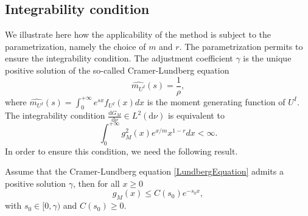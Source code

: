 \subsection{Integrability condition}
We illustrate here how the applicability of the method is subject to the parametrization, namely the choice of $m$ and $r$. The parametrization permits to ensure the integrability condition. The adjustment coefficient $\gamma$ is the unique positive solution of the so-called Cramer-Lundberg equation
\begin{equation}\label{LundbergEquation}
\widehat{m_{U^{I}}}(s)=\frac{1}{\rho},
\end{equation}
where $\widehat{m_{U^{I}}}(s)=\int_{0}^{+\infty}e^{sx}f_{U^{I}}(x)dx$ is the moment generating function of $U^{I}$. The integrability condition $\frac{\text{d}G_{M}}{\text{d}\nu}\in L^{2}(\text{d}\nu)$ is equivalent to 
\begin{equation}\label{IntegrabiltyCondition}
\int^{+\infty}_{0}g_{M}^{2}(x) e^{x/m}x^{1-r}dx<\infty.
\end{equation}
In order to ensure this condition, we need the following result.
\begin{Theo}\label{Theo3}
Assume that the Cramer-Lundberg equation \eqref{LundbergEquation} admits a positive solution $\gamma$, then for all $x\geq0$
\begin{equation}\label{InequalityDefectiveCompoundDensity}
g_{M}(x)\leq C(s_{0})e^{-s_{0} x},
\end{equation}
with $s_{0}\in[0,\gamma)$ and $C(s_{0})\geq0$.
\end{Theo}
